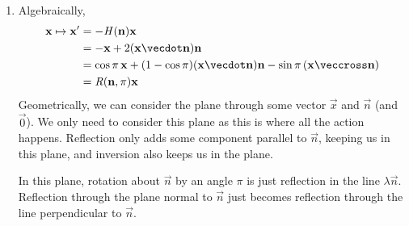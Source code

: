 \documentclass[fleqn,a4paper,11pt]{article}
\begin{document}
\begin{enumerate}[label=\textbf{\arabic*.}]
\begin{enumerate}[label=(\alph*)]
     \item
      Algebraically,
      \begin{align*}
       \vec x \mapsto \vec x'
        &= -\mat H(\vec n) \vec x \\
        &= -\vec x + 2(\vec x \vecdot \vec n) \vec n \\
        &= \cos\pi\,\vec x + (1 - \cos\pi)(\vec x \vecdot \vec n) \vec n
           - \sin \pi\,(\vec x \veccross \vec n) \\
        &= \mat R(\vec n, \pi) \vec x
      \end{align*}
      Geometrically, we can consider the plane through some
      vector \(\vec x\) and \(\vec n\) (and \(\vec 0\)). We only need to
      consider this plane as this is where all the action happens. Reflection
      only adds some component parallel to \(\vec n\), keeping us in this plane,
      and inversion also keeps us in the plane.

      In this plane, rotation about \(\vec n\) by an angle \(\pi\) is just
      reflection in the line \(\lambda \vec n\). Reflection through the plane
      normal to \(\vec n\) just becomes reflection through the line
      perpendicular to \(\vec n\).


\end{enumerate}
\end{enumerate}
\end{document}
